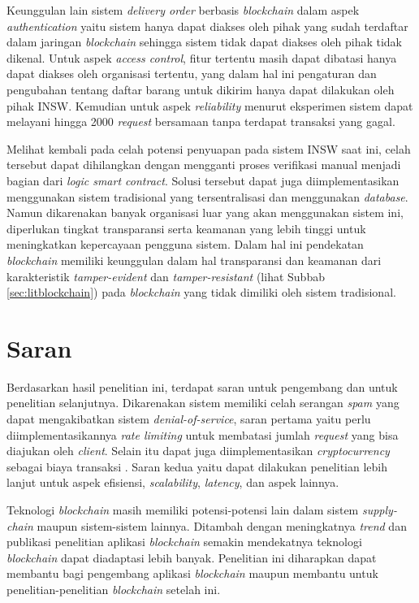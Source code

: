 Keunggulan lain sistem \textit{delivery order} berbasis \textit{blockchain} dalam aspek \textit{authentication} yaitu sistem hanya dapat diakses oleh pihak yang sudah terdaftar dalam jaringan \textit{blockchain} sehingga sistem tidak dapat diakses oleh pihak tidak dikenal. Untuk aspek \textit{access control}, fitur tertentu masih dapat dibatasi hanya dapat diakses oleh organisasi tertentu, yang dalam hal ini pengaturan dan pengubahan tentang daftar barang untuk dikirim hanya dapat dilakukan oleh pihak INSW. Kemudian untuk aspek \textit{reliability} menurut eksperimen sistem dapat melayani hingga 2000 \textit{request} bersamaan tanpa terdapat transaksi yang gagal.

Melihat kembali pada celah potensi penyuapan pada sistem INSW saat ini, celah tersebut dapat dihilangkan dengan mengganti proses verifikasi manual menjadi bagian dari \textit{logic smart contract}. Solusi tersebut dapat juga diimplementasikan menggunakan sistem tradisional yang tersentralisasi dan menggunakan \textit{database}. Namun dikarenakan banyak organisasi luar yang akan menggunakan sistem ini, diperlukan tingkat transparansi serta keamanan yang lebih tinggi untuk meningkatkan kepercayaan pengguna sistem. Dalam hal ini pendekatan \textit{blockchain} memiliki keunggulan dalam hal transparansi dan keamanan dari karakteristik \textit{tamper-evident} dan \textit{tamper-resistant} (lihat Subbab \ref{sec:litblockchain}) pada \textit{blockchain} yang tidak dimiliki oleh sistem tradisional.

\section{Saran}
\label{sec:saran}
Berdasarkan hasil penelitian ini, terdapat saran untuk pengembang dan untuk penelitian selanjutnya. Dikarenakan sistem memiliki celah serangan \textit{spam} yang dapat mengakibatkan sistem \textit{denial-of-service}, saran pertama yaitu perlu diimplementasikannya \textit{rate limiting} untuk membatasi jumlah \textit{request} yang bisa diajukan oleh \textit{client}. Selain itu dapat juga diimplementasikan \textit{cryptocurrency} sebagai biaya transaksi . Saran kedua yaitu dapat dilakukan penelitian lebih lanjut untuk aspek efisiensi, \textit{scalability}, \textit{latency}, dan aspek lainnya.

Teknologi \textit{blockchain} masih memiliki potensi-potensi lain dalam sistem \textit{supply-chain} maupun sistem-sistem lainnya. Ditambah dengan meningkatnya \textit{trend} dan publikasi penelitian aplikasi \textit{blockchain} \citep{Macrinici2018} semakin mendekatnya teknologi \textit{blockchain} dapat diadaptasi lebih banyak. Penelitian ini diharapkan dapat membantu bagi pengembang aplikasi \textit{blockchain} maupun membantu untuk penelitian-penelitian \textit{blockchain} setelah ini.
